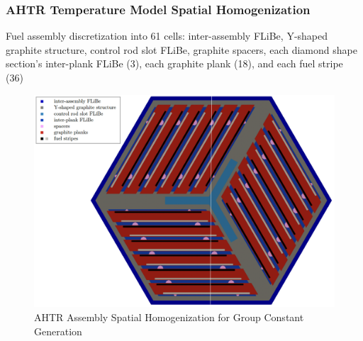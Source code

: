 \begin{frame}
    \frametitle{AHTR Temperature Model Spatial Homogenization}
        Fuel assembly discretization into 61 cells: inter-assembly FLiBe, Y-shaped graphite 
        structure, control rod slot FLiBe, graphite spacers, each diamond shape 
        section's inter-plank FLiBe (3), each graphite plank (18), and each
        fuel stripe (36)
    \begin{figure}[]
        \begin{minipage}[c]{0.75\textwidth}
            \centering
            \includegraphics[width=0.8\linewidth]{figures/assembly_mg_pres.png}
        \end{minipage}\hfill
        \begin{minipage}[c]{0.25\textwidth}
        \caption{AHTR Assembly Spatial Homogenization for Group Constant Generation}
    \end{minipage}
    \end{figure}

\end{frame}


